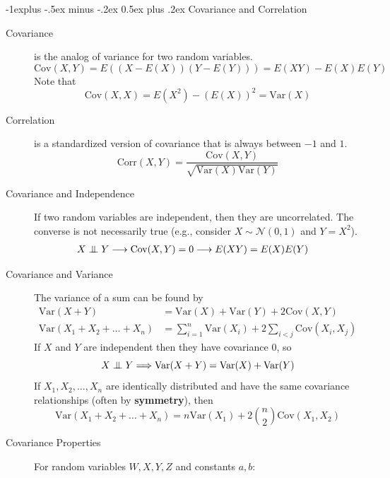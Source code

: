 \documentclass[6pt, landscape]{article}
\makeatletter
\renewcommand{\subsection}{\@startsection{subsection}{2}{0mm}%
                                {-1explus -.5ex minus -.2ex}%
                                {0.5ex plus .2ex}%
                                {\small\bfseries}}
\newcommand{\var}{\textrm{Var}}
\newcommand{\cov}{\textrm{Cov}}
\newcommand{\corr}{\textrm{Corr}}
\renewcommand{\N}{\mathcal{N}}
\newcommand\independent{\protect\mathpalette{\protect\independenT}{\perp}}
\def\independenT#1#2{\mathrel{\setbox0\hbox{$#1#2$}%
    \copy0\kern-\wd0\mkern4mu\box0}}
\makeatother
\begin{document}
\begin{multicols}{3}
        \subsection{Covariance and Correlation}
        \begin{description}
                \item [Covariance] is the analog of variance for two random variables.
                      \[\cov(X, Y) = E\left((X - E(X))(Y - E(Y))\right) = E(XY) - E(X)E(Y)\]
                      Note that
                      \[\cov(X, X) = E(X^2) - (E(X))^2 =  \var(X)\]
                \item [Correlation] is a standardized version of covariance that is always between $-1$ and $1$.
                      \[\corr(X, Y) = \frac{\cov(X, Y)}{\sqrt{\var(X)\var(Y)}} \]
                \item [Covariance and Independence] If two random variables are independent, then they are uncorrelated. The converse is not necessarily true (e.g., consider $X \sim \N(0,1)$ and $Y=X^2$).
                      \begin{align*}
                              X \independent Y & \longrightarrow \cov(X, Y) = 0 \longrightarrow E(XY) = E(X)E(Y)
                      \end{align*}
                \item [Covariance and Variance]  The variance of a sum can be found by
                      \begin{align*}
                              \var(X + Y)                    & = \var(X) + \var(Y) + 2\cov(X, Y)                          \\
                              \var(X_1 + X_2 + \dots + X_n ) & = \sum_{i = 1}^{n}\var(X_i) + 2\sum_{i < j} \cov(X_i, X_j)
                      \end{align*}
                      If $X$ and $Y$ are independent then they have covariance $0$, so
                      \[X \independent Y \Longrightarrow \var(X + Y) = \var(X) + \var(Y)\]
                      If $X_1, X_2, \dots, X_n$ are identically distributed and have the same covariance relationships (often by \textbf{symmetry}), then
                      \[\var(X_1 + X_2 + \dots + X_n ) = n\var(X_1) + 2{n \choose 2}\cov(X_1, X_2)\]
                \item [Covariance Properties]  For random variables $W, X, Y, Z$ and constants $a, b$:

\end{description}
\end{multicols}
\end{document}

